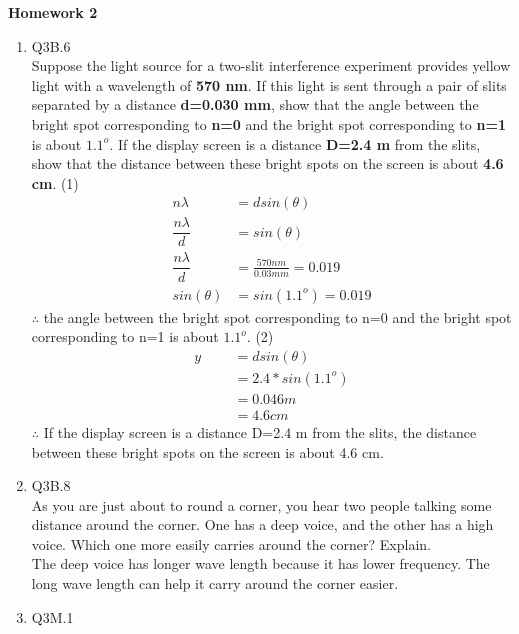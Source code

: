 \documentclass{article}
\theoremstyle{definition}
\theoremstyle{plain}
\begin{document}
\begin{center} \bf \LARGE Homework 2\\
\end{center}


\begin {enumerate}[itemindent=30pt,label=\bf Exercise {\arabic*}:]

\item Q3B.6\\
Suppose the light source for a two-slit interference experiment provides yellow light with a wavelength of \textbf{570 nm}. If this light is sent through a pair of slits separated by a distance \textbf{d=0.030 mm}, show that the angle between the bright spot corresponding to \textbf{n=0} and the bright spot corresponding to \textbf{n=1} is about \textbf{$1.1^{o}$}. If the display screen is a distance \textbf{D=2.4 m} from the slits, show that the distance between these bright spots on the screen is about \textbf{4.6 cm}.
\subitem (1)
\begin{align*}
	n \lambda &= d sin(\theta)\\
	\dfrac{n \lambda}{d} &= sin(\theta)\\
	\dfrac{n \lambda}{d} & = \frac{570 nm}{0.03 mm} = 0.019\\
 	sin(\theta) &= sin(1.1^{o}) = 0.019
\end{align*}
\subitem $\therefore$ the angle between the bright spot corresponding to n=0 and the bright spot corresponding to n=1 is about $1.1^{o}$.
\subitem (2)
 \begin{align*}
	y &= d sin(\theta) \\
	\quad\quad &= 2.4 * sin(1.1^{o}) \\
	\quad\quad &= 0.046 m\\
	\quad\quad &= 4.6 cm
\end{align*}
\subitem $\therefore$ If the display screen is a distance D=2.4 m from the slits, the distance between these bright spots on the screen is about 4.6 cm.
\item Q3B.8\\
As you are just about to round a corner, you hear two people talking some distance around the corner. One has a deep voice, and the other has a high voice. Which one more easily carries around the corner? Explain. \\
\subitem The deep voice has longer wave length because it has lower frequency. The long wave length can help it carry around the corner easier.
\newpage
\item Q3M.1 \\

\end{enumerate}
\end{document}
